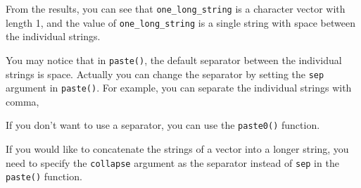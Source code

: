 \documentclass[
]{book}
\newenvironment{Shaded}{\begin{snugshade}}{\end{snugshade}}
\newcommand{\AttributeTok}[1]{\textcolor[rgb]{0.77,0.63,0.00}{#1}}
\newcommand{\CommentTok}[1]{\textcolor[rgb]{0.56,0.35,0.01}{\textit{#1}}}
\newcommand{\DocumentationTok}[1]{\textcolor[rgb]{0.56,0.35,0.01}{\textbf{\textit{#1}}}}
\newcommand{\FunctionTok}[1]{\textcolor[rgb]{0.00,0.00,0.00}{#1}}
\newcommand{\NormalTok}[1]{#1}
\newcommand{\OtherTok}[1]{\textcolor[rgb]{0.56,0.35,0.01}{#1}}
\newcommand{\StringTok}[1]{\textcolor[rgb]{0.31,0.60,0.02}{#1}}
\begin{document}
From the results, you can see that \texttt{one\_long\_string} is a character vector with length 1, and the value of \texttt{one\_long\_string} is a single string with space between the individual strings.

You may notice that in \texttt{paste()}, the default separator between the individual strings is space. Actually you can change the separator by setting the \texttt{sep} argument in \texttt{paste()}. For example, you can separate the individual strings with comma,

\begin{Shaded}
\end{Shaded}

If you don't want to use a separator, you can use the \texttt{paste0()} function.

\begin{Shaded}
\end{Shaded}

If you would like to concatenate the strings of a vector into a longer string, you need to specify the \texttt{collapse} argument as the separator instead of \texttt{sep} in the \texttt{paste()} function.

\begin{Shaded}
\end{Shaded}
\end{document}
